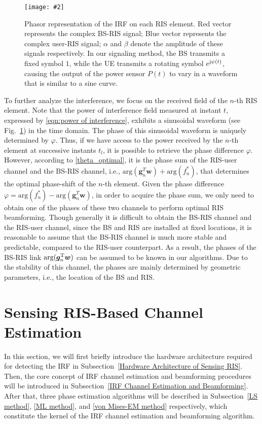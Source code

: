 \documentclass[12pt,draftclsnofoot,journal,onecolumn]{IEEEtran}
\theoremstyle{nonumberplain}
\def \arg {\text{arg}}
\newcommand{\myincludegraphics}[2][width=12cm]{\texttt{[image: \#2]}}
\begin{document}
    \begin{figure}[!t]
        \centering
        \myincludegraphics{figures/phasor.pdf}
        \caption{Phasor representation of the \ac{IRF} on each RIS element. Red vector represents the complex BS-RIS signal; Blue vector represents the complex user-RIS signal; $\alpha$ and $\beta$ denote the amplitude of these signals respectively. In our signaling method, the BS transmits a fixed symbol $1$, while the UE transmits a rotating symbol $e^{{\rm j}\psi(t)}$, causing the output of the power sensor $P(t)$ to vary in a waveform that is similar to a sine curve.}
        \label{fig:phasor}
    \end{figure}
    To further analyze the interference, we focus on the received field of the $n$-th RIS element. Note that the power of interference field measured at instant $t$, expressed by \eqref{eqn:power of interference}, exhibits a sinusoidal waveform (see Fig.~\ref{fig:phasor}) in the time domain. The phase of this sinusoidal waveform is uniquely determined by $\varphi$.
    Thus, if we have access to the power received by the $n$-th element at successive instants $t_l$, it is possible to retrieve the phase difference $\varphi$. 
    However, according to \eqref{theta_optimal}, it is the phase sum of the RIS-user channel and the BS-RIS channel, i.e., $\arg({\bm g}_n^{T}{\bm w})+\arg(f_n^*)$, that determines the optimal phase-shift of the $n$-th element. Given the phase difference $\varphi = \arg\left(f_{n}^{*}\right)-\arg\left(\bm g_{n}^{T}\bm w\right)$, in order to acquire the phase sum, we only need to obtain one of the phases of these two channels to perform optimal RIS beamforming. Though generally it is difficult to obtain the BS-RIS channel and the RIS-user channel, since the BS and RIS are installed at fixed locations, it is reasonable to assume that the BS-RIS channel is much more stable and predictable, compared to the RIS-user counterpart. As a result, the phases of the BS-RIS link $\arg({\bm g}_n^{\rm T}{\bm w})$ can be assumed to be known in our algorithms. Due to the stability of this channel, the phases are mainly determined by geometric parameters, i.e., the location of the BS and RIS. 

    

\section{Sensing RIS-Based Channel Estimation}
\label{Sensing RIS-Based Channel Estimation}
In this section, we will first briefly introduce the hardware architecture required for detecting the \ac{IRF} in Subsection~\ref{Hardware Architecture of Sensing RIS}. Then, the core concept of IRF channel estimation and beamforming procedures will be introduced in Subsection~\ref{IRF Channel Estimation and Beamforming}. After that, three phase estimation algorithms will be described in Subsection~\ref{LS method}, \ref{ML method}, and \ref{von Mises-EM method} respectively, which constitute the kernel of the \ac{IRF} channel estimation and beamforming algorithm. 
\end{document}

